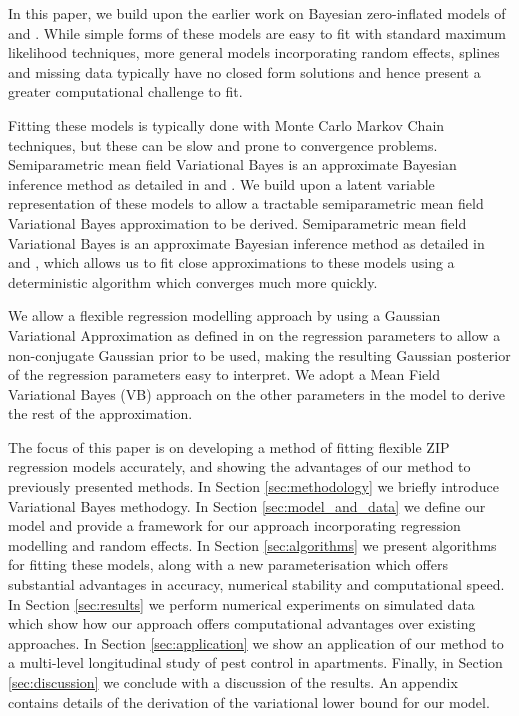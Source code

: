 \documentclass[times, doublespace]{anzsauth}
\begin{document}
\noindent In this paper, we build upon the earlier work on Bayesian zero-inflated models of
\cite{Ghosh20061360} and \cite{VatsaWilson2014}. While simple forms of these models are easy to fit with
standard maximum likelihood techniques, more general models incorporating random effects, splines and missing
data typically have no closed form solutions and hence present a greater computational challenge to fit.

\noindent Fitting these models is typically done with Monte Carlo Markov Chain techniques, but these can be
slow and prone to convergence problems. Semiparametric mean field Variational Bayes is an approximate Bayesian
inference method as detailed in \cite{ormerod10} and \cite{RohdeWand2015}. We build upon a latent variable
representation of these models to allow a tractable semiparametric mean field Variational Bayes approximation
to be derived. Semiparametric mean field Variational Bayes is an approximate Bayesian inference method as
detailed in \cite{ormerod10} and \cite{RohdeWand2015}, which allows us to fit close approximations to these
models using a deterministic algorithm which converges much more quickly.

\noindent We allow a flexible regression modelling approach by using a Gaussian Variational Approximation as
defined in \cite{ormerod09} on the regression parameters to allow a non-conjugate Gaussian prior to be used,
making the resulting Gaussian posterior of the regression parameters easy to interpret. We adopt a Mean Field
Variational Bayes (VB) approach on the other parameters in the model to derive the rest of the approximation.

\noindent The focus of this paper is on developing a method of fitting flexible ZIP regression models
accurately, and showing the advantages of our method to previously presented methods. In Section
\ref{sec:methodology} we briefly introduce Variational Bayes methodogy. In Section \ref{sec:model_and_data} we
define our model and provide a framework for our approach incorporating regression modelling and random
effects. In Section \ref{sec:algorithms} we present algorithms for fitting these models, along with a new
parameterisation which offers substantial advantages in accuracy, numerical stability and computational speed.
In Section \ref{sec:results} we perform numerical experiments on simulated data which show how our approach
offers computational advantages over existing approaches. In Section \ref{sec:application} we show an
application of our method to a multi-level longitudinal study of pest control in apartments. Finally, in
Section \ref{sec:discussion} we conclude with a discussion of the results. An appendix contains details of the
derivation of the variational lower bound for our model.
\end{document}
